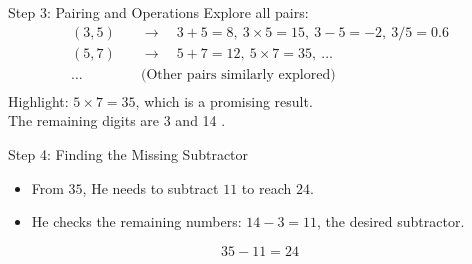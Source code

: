 \documentclass[aspectratio=169, xcolor={dvipsnames}, 10pt, brazil]{beamer}
\begin{document}
\begin{frame}{Step 3: Pairing and Operations}
    Explore all pairs:
    \[
    \begin{aligned}
        (3,5) &\quad \rightarrow \quad 3+5=8, \ 3 \times 5=15, \ 3-5=-2, \ 3/5=0.6 \\
        (5,7) &\quad \rightarrow \quad 5+7=12, \ 5 \times 7=35, \ \ldots \\
        \ldots &\quad \text{(Other pairs similarly explored)} \\
    \end{aligned}
    \]
    \pause
    \vspace{0.5cm}
    Highlight: \( 5 \times 7 = 35 \), which is a promising result.\\
    \pause
    The remaining digits are 3 and 14 .
\end{frame}
\begin{frame}{Step 4: Finding the Missing Subtractor}
    \begin{itemize}
        \item From \( 35 \), He needs to subtract \( 11 \) to reach \( 24 \).
        \pause
        \item He checks the remaining numbers: \( 14 - 3 = 11 \), the desired subtractor.
        
    \end{itemize}
    \[
    35 - 11 = 24
    \]
    \centering
    \vspace{-1cm}
    \vspace{0.5cm}
    
   
\end{frame}
\end{document}
